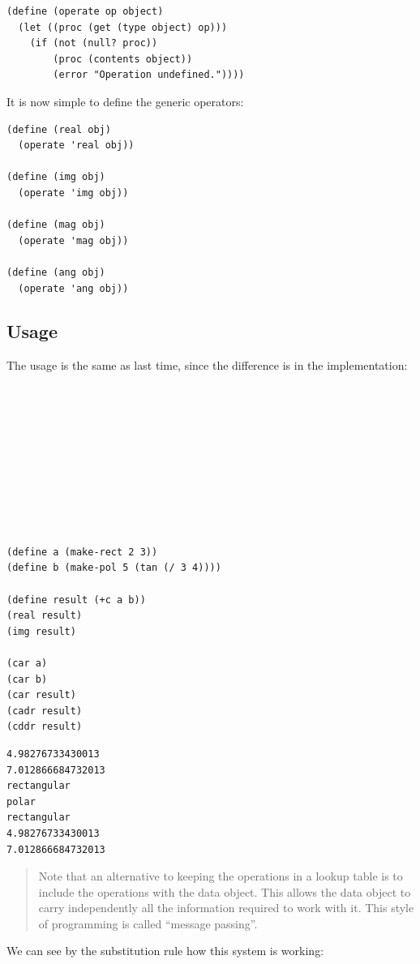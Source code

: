 \documentclass[9pt]{report}
\begin{document}
\begin{verbatim}
(define (operate op object)
  (let ((proc (get (type object) op)))
    (if (not (null? proc))
        (proc (contents object))
        (error "Operation undefined."))))
\end{verbatim}

It is now simple to define the generic operators:

\begin{verbatim}
(define (real obj)
  (operate 'real obj))

(define (img obj)
  (operate 'img obj))

(define (mag obj)
  (operate 'mag obj))

(define (ang obj)
  (operate 'ang obj))
\end{verbatim}


\subsection{Usage}
\label{sec:orga76a976}

The usage is the same as last time, since the difference is in the
implementation:

\begin{verbatim}










(define a (make-rect 2 3))
(define b (make-pol 5 (tan (/ 3 4))))

(define result (+c a b))
(real result)
(img result)

(car a)
(car b)
(car result)
(cadr result)
(cddr result)

\end{verbatim}

\begin{verbatim}
4.98276733430013
7.012866684732013
rectangular
polar
rectangular
4.98276733430013
7.012866684732013
\end{verbatim}


\begin{quote}
Note that an alternative to keeping the operations in a lookup
table is to include the operations with the data object. This
allows the data object to carry independently all the information
required to work with it. This style of programming is called
``message passing''.
\end{quote}

We can see by the substitution rule how this system is working:
\end{document}
